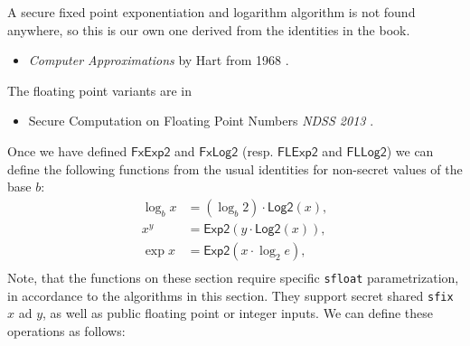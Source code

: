 
A secure fixed point exponentiation and logarithm algorithm is not found anywhere, so
this is our own one derived from the identities in the book.
\begin{itemize}
\item {\em Computer Approximations} by Hart from 1968 \cite{Hart:1978:CA:540084}.
\end{itemize}
The floating point variants are in
\begin{itemize}
\item Secure Computation on Floating Point Numbers {\em NDSS 2013} \cite{ABZS13}.
\end{itemize}
Once we have defined $\mathsf{FxExp2}$ and $\mathsf{FxLog2}$
(resp. $\mathsf{FLExp2}$ and $\mathsf{FLLog2}$) we can
define the following functions from the usual identities
for non-secret values of the base $b$:
\begin{align*}
	\log_b x &= (\log_b 2) \cdot \mathsf{Log2}(x), \\
	x^y      &= \mathsf{Exp2}(y \cdot \mathsf{Log2}(x)), \\
	\exp   x &= \mathsf{Exp2}(x \cdot \log_2 e), \\
\end{align*}
Note, that the functions on these section require specific \verb|sfloat| parametrization, in accordance to the algorithms in this section. They support secret shared \verb|sfix| $x$ ad $y$, as well as public floating point or integer inputs.  We can define these operations as follows:

